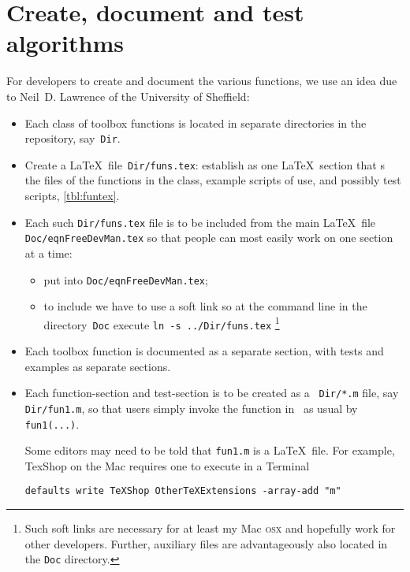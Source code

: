 \chapter{Create, document and test algorithms}
\label{sec:contribute}
\secttoc
\def\LaTeX{LaTeX}%

For developers to create and document the various functions, we use an idea due to Neil~D. Lawrence of the University of Sheffield:

\begin{itemize}
\item Each class of toolbox functions is located in separate directories in the repository, say~\verb|Dir|.

\item Create a \LaTeX\ file~\verb|Dir/funs.tex|: establish as one \LaTeX\ section that \verb||s the  files of the functions in the class, example scripts of use, and possibly test scripts, \autoref{tbl:funtex}.

\item Each such \verb|Dir/funs.tex| file is to be included from the main \LaTeX\ file \verb|Doc/eqnFreeDevMan.tex| so that people can most easily work on one section at a time: 
\begin{itemize}
\item put \verb|| into \verb|Doc/eqnFreeDevMan.tex|;
\item to include we have to use a soft link so at the command line in the directory~\verb|Doc| execute \verb|ln -s ../Dir/funs.tex|
\footnote{Such soft links are necessary for at least my Mac \textsc{osx} and hopefully work for other developers.  Further, auxiliary files are advantageously also located in the \texttt{Doc} directory.}
\end{itemize}


\item Each toolbox function is documented as a separate section, with tests and examples as separate sections.

\item Each function-section and test-section is to be created as a \script\ \verb|Dir/*.m| file, say \verb|Dir/fun1.m|, so that users simply invoke the function in \script\ as usual by \verb|fun1(...)|.

Some editors may need to be told that \verb|fun1.m| is a \LaTeX\ file.  For example, TexShop on the Mac requires one to execute in a Terminal
\begin{verbatim}
defaults write TeXShop OtherTeXExtensions -array-add "m"
\end{verbatim}


\end{itemize}
